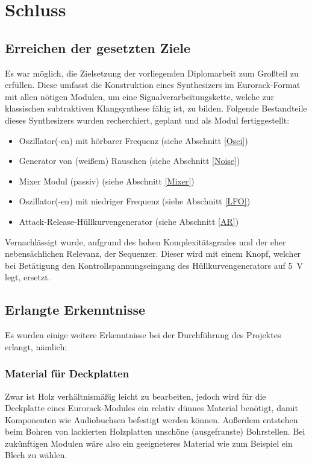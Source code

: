 \chapter{Schluss}

\section{Erreichen der gesetzten Ziele}
\label{sec:orgff9be37}
Es war möglich, die Zielsetzung der vorliegenden Diplomarbeit zum Großteil zu erfüllen. Diese umfasst die Konstruktion eines Synthesizers im Eurorack-Format mit allen nötigen Modulen, um eine Signalverarbeitungskette, welche zur klassischen subtraktiven Klangsynthese fähig ist, zu bilden. Folgende Bestandteile dieses Synthesizers wurden recherchiert, geplant und als Modul fertiggestellt:

\begin{itemize}
\item Oszillator(-en) mit hörbarer Frequenz (siehe Abschnitt \ref{Osci})
\item Generator von (weißem) Rauschen (siehe Abschnitt \ref{Noise})
\item Mixer Modul (passiv) (siehe Abschnitt \ref{Mixer})
\item Oszillator(-en) mit niedriger Frequenz (siehe Abschnitt \ref{LFO})
\item Attack-Release-Hüllkurvengenerator (siehe Abschnitt \ref{AR})
\end{itemize}

Vernachlässigt wurde, aufgrund des hohen Komplexitätsgrades und der eher nebensächlichen Relevanz, der Sequenzer. Dieser wird mit einem Knopf, welcher bei Betätigung den Kontrollspannungseingang des Hüllkurvengenerators auf \SI{5}{\volt} legt, ersetzt.

\section{Erlangte Erkenntnisse}
\label{sec:org6fc26b2}
Es wurden einige weitere Erkenntnisse bei der Durchführung des Projektes erlangt, nämlich:

\subsection{Material für Deckplatten}
\label{sec:org28cf6ed}
Zwar ist Holz verhältnismäßig leicht zu bearbeiten, jedoch wird für die Deckplatte eines Eurorack-Modules ein relativ dünnes Material benötigt, damit Komponenten wie Audiobuchsen befestigt werden können. Außerdem entstehen beim Bohren von lackierten Holzplatten unschöne (ausgefranste) Bohrstellen. Bei zukünftigen Modulen wäre also ein geeigneteres Material wie zum Beispiel ein Blech zu wählen.

